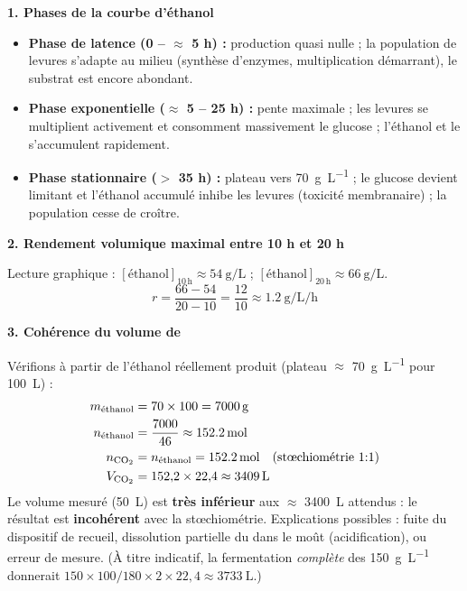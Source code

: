 \documentclass[11pt]{article}
\begin{document}
\begin{corrige}
\textbf{1. Phases de la courbe d'éthanol}
\begin{itemize}
    \item \textbf{Phase de latence (0 -- $\approx$ 5 h) :} production quasi nulle ; la population de levures s'adapte au milieu (synthèse d'enzymes, multiplication démarrant), le substrat est encore abondant.
    \item \textbf{Phase exponentielle ($\approx$ 5 -- 25 h) :} pente maximale ; les levures se multiplient activement et consomment massivement le glucose ; l'éthanol et le  s'accumulent rapidement.
    \item \textbf{Phase stationnaire ($>$ 35 h) :} plateau vers \SI{70}{\gram\per\liter} ; le glucose devient limitant et l'éthanol accumulé inhibe les levures (toxicité membranaire) ; la population cesse de croître.
\end{itemize}

\textbf{2. Rendement volumique maximal entre 10 h et 20 h}

Lecture graphique : $[\text{éthanol}]_{10\,\text{h}} \approx \SI{54}{\gram\per\liter}$ ; $[\text{éthanol}]_{20\,\text{h}} \approx \SI{66}{\gram\per\liter}$.
\[ r = \frac{66 - 54}{20 - 10} = \frac{12}{10} \approx \boxed{\SI{1,2}{\gram\per\liter\per\hour}} \]

\textbf{3. Cohérence du volume de }

Vérifions à partir de l'éthanol réellement produit (plateau $\approx$ \SI{70}{\gram\per\liter} pour \SI{100}{\liter}) :
\begin{align*}
m_{\text{éthanol}} &= 70 \times 100 = \SI{7000}{\gram} \\
n_{\text{éthanol}} &= \frac{7000}{46} \approx \SI{152,2}{\mole} \\
n_{\ce{CO2}} &= n_{\text{éthanol}} = \SI{152,2}{\mole} \quad (\text{stœchiométrie 1:1}) \\
V_{\ce{CO2}} &= 152{,}2 \times 22{,}4 \approx \SI{3409}{\liter}
\end{align*}
Le volume mesuré (\SI{50}{\liter}) est \textbf{très inférieur} aux $\approx$ \SI{3400}{\liter} attendus : le résultat est \textbf{incohérent} avec la stœchiométrie. Explications possibles : fuite du dispositif de recueil, dissolution partielle du  dans le moût (acidification), ou erreur de mesure. (À titre indicatif, la fermentation \emph{complète} des \SI{150}{\gram\per\liter} donnerait $150 \times 100 / 180 \times 2 \times 22{,}4 \approx \SI{3733}{\liter}$.)


\end{corrige}
\end{document}
